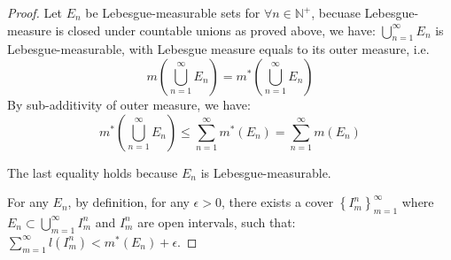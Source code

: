 \documentclass[reqno]{amsart}
\theoremstyle{definition}
\begin{document}
\begin{proof}
Let $E_{n}$ be Lebesgue-measurable sets for $\forall n \in \mathbb{N}^{+}$, becuase Lebesgue-measure is closed under countable unions as proved above, we have: $\bigcup\limits^{\infty}_{n=1} E_{n}$ is Lebesgue-measurable, with Lebesgue measure equals to its outer measure, i.e.
$$
m\left(\bigcup\limits^{\infty}_{n=1} E_{n}\right) = m^{*}\left(\bigcup\limits^{\infty}_{n=1} E_{n}\right)
$$ 
By sub-additivity of outer measure, we have:
$$
m^{*}\left(\bigcup\limits^{\infty}_{n=1} E_{n}\right) \leq \sum\limits^{\infty}_{n=1} m^{*}(E_{n}) = \sum\limits^{\infty}_{n=1} m(E_{n})
$$

The last equality holds because $E_{n}$ is Lebesgue-measurable.

For any $E_{n}$, by definition, for any $\epsilon > 0$, there exists a cover $\left\{ I^{n}_{m} \right\}^{\infty}_{m=1}$ where $E_{n} \subset \bigcup\limits^{\infty}_{m=1} I^{n}_{m}$ and $I^{n}_{m}$ are open intervals, such that: $\sum\limits^{\infty}_{m=1}l(I^{n}_{m}) < m^{*}\left(E_{n}\right) + \epsilon$.
\end{proof}
\end{document}
